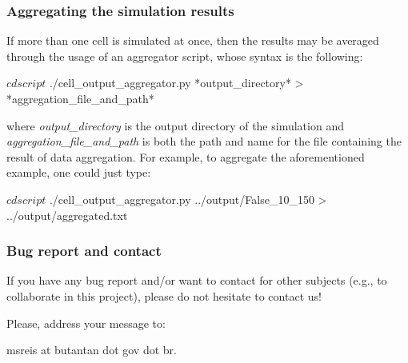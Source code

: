 \subsubsection*{Aggregating the simulation results}

If more than one cell is simulated at once, then the results may be averaged through the usage of an aggregator script, whose syntax is the following\+: 
\begin{DoxyCode}
$ cd script
$ ./cell\_output\_aggregator.py *output\_directory* > *aggregation\_file\_and\_path*
\end{DoxyCode}
 where {\itshape output\+\_\+directory} is the output directory of the simulation and {\itshape aggregation\+\_\+file\+\_\+and\+\_\+path} is both the path and name for the file containing the result of data aggregation. For example, to aggregate the aforementioned example, one could just type\+: 
\begin{DoxyCode}
$ cd script
$ ./cell\_output\_aggregator.py ../output/False\_10\_150 > ../output/aggregated.txt
\end{DoxyCode}


\subsubsection*{Bug report and contact}

If you have any bug report and/or want to contact for other subjects (e.\+g., to collaborate in this project), please do not hesitate to contact us!

Please, address your message to\+:

msreis at butantan dot gov dot br. 